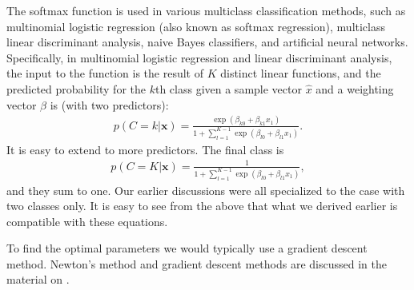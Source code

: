 \documentclass[letterpaper,10pt,english]{sphinxmanual}
\begin{document}
The softmax function is used in various multiclass classification
methods, such as multinomial logistic regression (also known as
softmax regression), multiclass linear discriminant analysis, naive
Bayes classifiers, and artificial neural networks.  Specifically, in
multinomial logistic regression and linear discriminant analysis, the
input to the function is the result of \(K\) distinct linear functions,
and the predicted probability for the \(k\)\sphinxhyphen{}th class given a sample
vector \(\hat{x}\) and a weighting vector \(\hat{\beta}\) is (with two
predictors):
\begin{equation*}
\begin{split}
p(C=k\vert \mathbf {x} )=\frac{\exp{(\beta_{k0}+\beta_{k1}x_1)}}{1+\sum_{l=1}^{K-1}\exp{(\beta_{l0}+\beta_{l1}x_1)}}.
\end{split}
\end{equation*}
It is easy to extend to more predictors. The final class is
\begin{equation*}
\begin{split}
p(C=K\vert \mathbf {x} )=\frac{1}{1+\sum_{l=1}^{K-1}\exp{(\beta_{l0}+\beta_{l1}x_1)}},
\end{split}
\end{equation*}
and they sum to one. Our earlier discussions were all specialized to
the case with two classes only. It is easy to see from the above that
what we derived earlier is compatible with these equations.

To find the optimal parameters we would typically use a gradient
descent method.  Newton’s method and gradient descent methods are
discussed in the material on .
\end{document}
